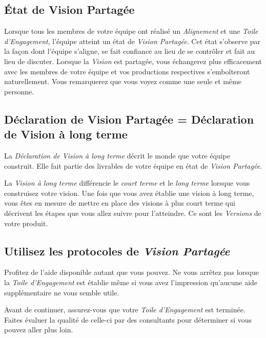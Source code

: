 \documentclass[paper=6in:9in,pagesize=pdftex,headinclude=on,footinclude=on,12pt]{scrbook}
\begin{document}
\subsection{État de Vision Partagée}

Lorsque tous les membres de votre équipe ont réalisé un \emph{Alignement} et une \emph{Toile d'Engagement}, l'équipe atteint un état
de \emph{Vision Partagée}. Cet état s'observe par la façon dont l'équipe s'aligne, se fait confiance au lieu de se contrôler et fait au
lieu de discuter. Lorsque la \emph{Vision} est partagée, vous échangerez plus efficacement avec les membres de votre équipe et vos
productions respectives s'emboîteront naturellement. Vous remarquerez que vous \og{}voyez comme une seule et même personne\fg{}.

\subsection{Déclaration de Vision Partagée = Déclaration de Vision à long terme}

La \emph{Déclaration de Vision à long terme} décrit le monde que votre équipe construit. Elle fait partie des livrables de votre équipe
en état de \emph{Vision Partagée}.

La \emph{Vision à long terme} différencie le \emph{court terme} et le \emph{long terme} lorsque vous construisez votre vision. Une fois
que vous avez établie une vision à long terme, vous êtes en mesure de mettre en place des visions à plus court terme qui décrivent les
étapes que vous allez suivre pour l'atteindre. Ce sont les \emph{Versions} de votre produit.

\subsection{Utilisez les protocoles de \emph{Vision Partagée}}

Profitez de l'aide disponible autant que vous pouvez. Ne vous arrêtez pas lorsque la \emph{Toile d'Engagement} est
établie même si vous avez l'impression qu'aucune aide supplémentaire ne vous semble utile.

Avant de continuer, assurez-vous que votre \emph{Toile d'Engagement} est terminée. Faites évaluer la qualité de celle-ci par des
consultants pour déterminer si vous pouvez aller plus loin.
\end{document}
